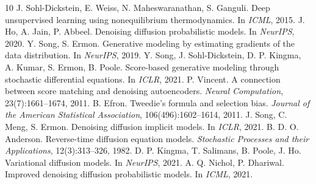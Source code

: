 \begin{thebibliography}{10}
   J. Sohl-Dickstein, E. Weiss, N. Maheswaranathan, S. Ganguli. Deep unsupervised learning using nonequilibrium thermodynamics. In \emph{ICML}, 2015.
   J. Ho, A. Jain, P. Abbeel. Denoising diffusion probabilistic models. In \emph{NeurIPS}, 2020.
   Y. Song, S. Ermon. Generative modeling by estimating gradients of the data distribution. In \emph{NeurIPS}, 2019.
   Y. Song, J. Sohl-Dickstein, D. P. Kingma, A. Kumar, S. Ermon, B. Poole. Score-based generative modeling through stochastic differential equations. In \emph{ICLR}, 2021.
   P. Vincent. A connection between score matching and denoising autoencoders. \emph{Neural Computation}, 23(7):1661--1674, 2011.
   B. Efron. Tweedie's formula and selection bias. \emph{Journal of the American Statistical Association}, 106(496):1602--1614, 2011.
   J. Song, C. Meng, S. Ermon. Denoising diffusion implicit models. In \emph{ICLR}, 2021.
   B. D. O. Anderson. Reverse-time diffusion equation models. \emph{Stochastic Processes and their Applications}, 12(3):313--326, 1982.
   D. P. Kingma, T. Salimans, B. Poole, J. Ho. Variational diffusion models. In \emph{NeurIPS}, 2021.
   A. Q. Nichol, P. Dhariwal. Improved denoising diffusion probabilistic models. In \emph{ICML}, 2021.
\end{thebibliography}
